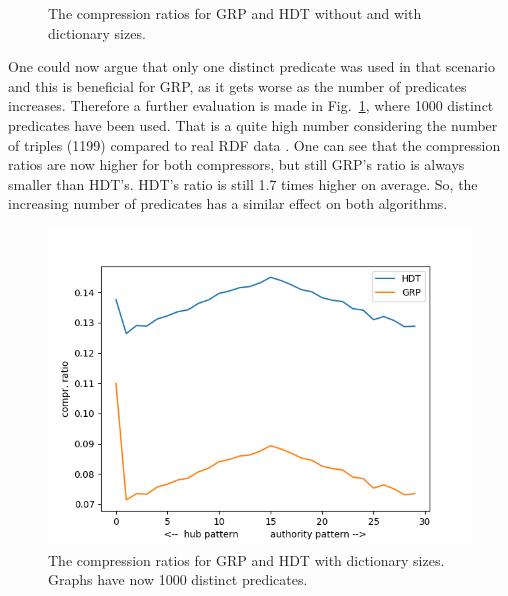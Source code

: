 \begin{figure}[h]
	\centering
	\hfill
	\caption{The compression ratios for GRP and HDT without and with dictionary sizes.}
\end{figure}

One could now argue that only one distinct predicate was used in that scenario and this is beneficial for GRP, as it gets worse as the number of predicates increases. Therefore a further evaluation is made in Fig.~\ref{fig:bothwithdict1000predicates}, where 1000 distinct predicates have been used. That is a quite high number considering the number of triples (1199) compared to real RDF data . One can see that the compression ratios are now higher for both compressors, but still GRP's ratio is always smaller than HDT's. HDT's ratio is still 1.7 times higher on average. So, the increasing number of predicates has a similar effect on both algorithms.

\begin{figure}
	\centering
	\includegraphics[width=0.7\linewidth]{figures/GRPvsHDT/bothWithDict1000Predicates}
	\caption{The compression ratios for GRP and HDT with dictionary sizes. Graphs have now 1000 distinct predicates.}
	\label{fig:bothwithdict1000predicates}
\end{figure}

